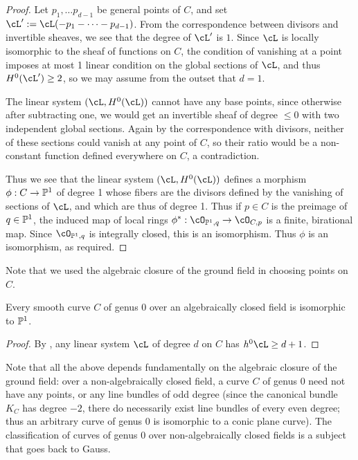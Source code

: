 \begin{proof}
Let $p_1,\dots p_{d-1}$ be general points of $C$, and set $\cL':=\cL(-p_1-\cdots-p_{d-1})$. From the correspondence between divisors and
invertible sheaves, we see that the degree of $\cL'$ is $1$.
 Since $\cL$ is locally isomorphic to the sheaf of functions on $C$, the condition of vanishing at a point imposes at most 1 linear condition on 
the global sections of $\cL$, and thus $H^0(\cL') \geq 2$, so we may assume from the outset that $d =1$.

The linear system $(\cL, H^0(\cL))$ cannot have any base points, since
otherwise after subtracting one, we would get an invertible sheaf of degree $\leq 0$ with two independent global sections. Again by the correspondence
with divisors, neither of these sections could vanish at any point of $C$, so their ratio would be a non-constant function defined everywhere on $C$,
a contradiction.

Thus we see that the linear system $(\cL, H^0(\cL))$ defines a morphism $\phi: C\to \PP^1$ of degree 1 whose fibers are the divisors defined by
the vanishing of sections of $\cL$, and which are thus of degree 1. Thus if $p\in C$ is the preimage of $q\in \PP^1$, the induced map of local rings
$\phi^*:\cO_{\PP^1, q} \to \cO_{C, p}$ is a finite, birational map. Since $\cO_{\PP^1, q}$ is integrally closed, this is an isomorphism. Thus 
$\phi$ is an isomorphism, as required. 
 \end{proof}

Note that we used the algebraic closure of the ground field in choosing points on $C$.


\begin{corollary}
 Every smooth curve $C$ of genus 0 over an algebraically closed field is isomorphic to $\PP^1$.
\end{corollary}

\begin{proof}
 By \trr, any linear system $\cL$ of degree $d$ on $C$ has $h^0\cL \geq d+1$.
\end{proof}

Note that all the above depends fundamentally on the algebraic closure of the ground field: over a non-algebraically closed field, a curve $C$ of genus 0 need not have any points, or any line bundles of odd degree (since the canonical bundle $K_C$ has degree $-2$, there do necessarily exist line bundles of every even degree; thus an arbitrary curve of genus 0 is isomorphic to a conic plane curve). 
The classification of curves of genus 0 over non-algebraically closed fields is a subject that goes back to Gauss.

